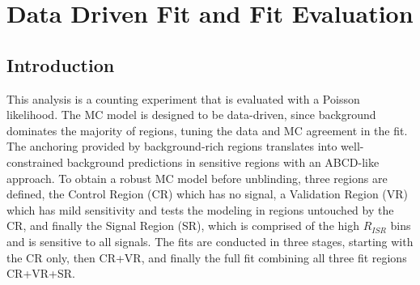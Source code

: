 \setcounter{secnumdepth}{3}
\setcounter{tocdepth}{3}
\setlength{\parskip}{\smallskipamount}
\setlength{\parindent}{0pt}


\makeatletter


\providecommand{\tabularnewline}{\\}


\makeatother

\chapter{Data Driven Fit and Fit Evaluation}

\section{Introduction}
This analysis is a counting experiment that is evaluated with a Poisson likelihood. The MC model is designed to be data-driven, since background dominates the majority of regions, tuning the data and MC agreement in the fit. The anchoring provided by background-rich regions translates into well-constrained background predictions in sensitive regions with an ABCD-like approach. To obtain a robust MC model before unblinding, three regions are defined, the Control Region (CR) which has no signal, a Validation Region (VR) which has mild sensitivity and tests the modeling in regions untouched by the CR, and finally the Signal Region (SR), which is comprised of the high $R_{ISR}$ bins and is sensitive to all signals. The fits are conducted in three stages, starting with the CR only, then CR+VR, and finally the full fit combining all three fit regions CR+VR+SR.

